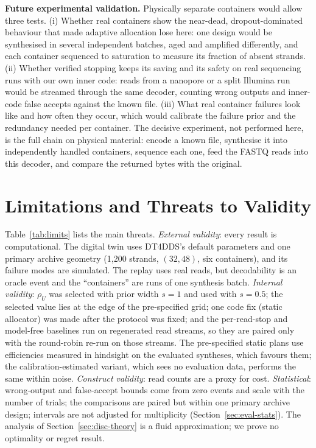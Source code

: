 \documentclass[conference,onecolumn,11pt]{IEEEtran}
\begin{document}
\textbf{Future experimental validation.}\label{sec:wetlab}  Physically separate containers would allow
three tests.  (i) Whether real containers show the near-dead, dropout-dominated behaviour that made
adaptive allocation lose here: one design would be synthesised in several independent batches, aged and
amplified differently, and each container sequenced to saturation to measure its fraction of absent
strands.  (ii) Whether verified stopping keeps its saving and its safety on real sequencing runs with our
own inner code: reads from a nanopore or a split Illumina run would be streamed through the same decoder,
counting wrong outputs and inner-code false accepts against the known file.  (iii) What real container
failures look like and how often they occur, which would calibrate the failure prior and the redundancy
needed per container.  The decisive experiment, not performed here, is the full chain on physical
material: encode a known file, synthesise it into independently handled containers, sequence each one,
feed the FASTQ reads into this decoder, and compare the returned bytes with the original.

\section{Limitations and Threats to Validity}\label{sec:limits}
Table~\ref{tab:limits} lists the main threats.  \emph{External validity}: every result is
computational.  The digital twin uses DT4DDS's default parameters and one primary archive geometry
(1{,}200 strands, $(32,48)$, six containers), and its failure modes are simulated.  The replay uses real
reads, but decodability is an oracle event and the ``containers'' are runs of one synthesis batch.
\emph{Internal validity}: $\rho_U$ was selected with prior width $s{=}1$ and used with $s{=}0.5$; the
selected value lies at the edge of the pre-specified grid; one code fix (static allocator) was made after
the protocol was fixed; and the per-read-stop and model-free baselines run on regenerated read streams,
so they are paired only with the round-robin re-run on those streams.  The pre-specified static plans use
efficiencies measured in hindsight on the evaluated syntheses, which favours them; the
calibration-estimated variant, which sees no evaluation data, performs the same within noise.
\emph{Construct validity}: read counts are a proxy for cost.  \emph{Statistical}: wrong-output and
false-accept bounds come from zero events and scale with the number of trials; the comparisons are
paired but within one primary archive design; intervals are not adjusted for multiplicity
(Section~\ref{sec:eval-stats}).  The analysis of Section~\ref{sec:disc-theory} is a fluid approximation;
we prove no optimality or regret result.

\end{document}
